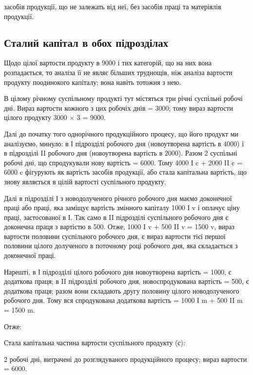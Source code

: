 \parcont{}  %
засобів продукції, що не залежать від неї, без засобів праці та матеріялів
продукції.

\subsection{Сталий капітал в обох підрозділах}

Щодо цілої вартости продукту в 9000 і тих категорій, що на них
вона розпадається, то аналіза її не являє більших труднощів, ніж аналіза
вартости продукту поодинокого капіталу; вона навіть тотожня з нею.

В цілому річному суспільному продукті тут містяться три річні суспільні
робочі дні. Вираз вартости кожного з цих робочіх днів = 3000; тому
вираз вартости цілого продукту 3000 × 3 = 9000.

Далі до початку того однорічного продукційного процесу, що його
продукт ми аналізуємо, минуло: в І підрозділі  робочого дня (новоутворена
вартість в 4000) і в підрозділі II  робочого дня (новоутворена
вартість в 2000). Разом 2 суспільні робочі дні, що спродукували
нову вартість = 6000. Тому 4000 І c + 2000 II c = 6000 c фігурують
як вартість засобів продукції, або стала капітальна вартість, що
знову являється в цілій вартості суспільного продукту.

Далі в підрозділі І з новодолученого річного робочого дня маємо 
доконечної праці або праці, яка заміщує вартість змінного капіталу 1000
І v і оплачує ціну праці, застосованої в І. Так само в II підрозділі  суспільного
робочого дня є доконечна праця з вартістю в 500. Отже, 1000
I v + 500 II v = 1500 v, вираз вартости половини суспільного робочого
дня, є вираз вартости тієї першої половини цілого долученого в поточному
році робочого дня, яка складається з доконечної праці.

Нарешті, в І підрозділі  цілого робочого дня новоутворена вартість =
1000, є додаткова праця; в II підрозділі  робочого дня, новоспродукована
вартість = 500, є додаткова праця; разом вони складають другу
половину цілого новодолученого робочого дня. Тому вся спродукована
додаткова вартість = 1000 І m + 500 II m = 1500 m.

Отже:

Стала капітальна частина вартости суспільного продукту (с):

2 робочі дні, витрачені до розглядуваного продукційного процесу;
вираз вартости = 6000.

